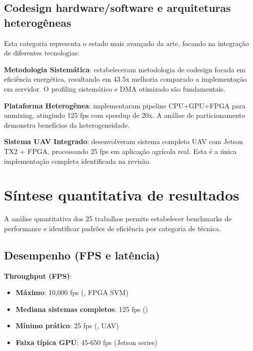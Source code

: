 \subsection{Codesign hardware/software e arquiteturas heterogêneas}\label{subsec:codesign_heterogeneas}

Esta categoria representa o estado mais avançado da arte, focando na integração de diferentes tecnologias:

\textbf{Metodologia Sistemática}: \textcite{Hwang2011} estabeleceram metodologia de codesign focada em eficiência energética, resultando em 43.5x melhoria comparado a implementação em servidor. O profiling sistemático e DMA otimizado são fundamentais.

\textbf{Plataforma Heterogênea}: \textcite{Torti2019} implementaram pipeline CPU+GPU+FPGA para unmixing, atingindo 125 fps com speedup de 20x. A análise de particionamento demonstra benefícios da heterogeneidade.

\textbf{Sistema UAV Integrado}: \textcite{Shin2020} desenvolveram sistema completo UAV com Jetson TX2 + FPGA, processando 25 fps em aplicação agrícola real. Esta é a única implementação completa identificada na revisão.

\section{Síntese quantitativa de resultados}\label{sec:sintese_quantitativa}

A análise quantitativa dos 25 trabalhos permite estabelecer benchmarks de performance e identificar padrões de eficiência por categoria de técnica.

\subsection{Desempenho (FPS e latência)}\label{subsec:desempenho_fps_latencia}

\textbf{Throughput (FPS)}:
\begin{itemize}
    \item \textbf{Máximo}: 10,000 fps (\textcite{Martins2019}, FPGA SVM)
    \item \textbf{Mediana sistemas completos}: 125 fps (\textcite{Torti2019})
    \item \textbf{Mínimo prático}: 25 fps (\textcite{Shin2020}, UAV)
    \item \textbf{Faixa típica GPU}: 45-650 fps (Jetson series)
\end{itemize}

